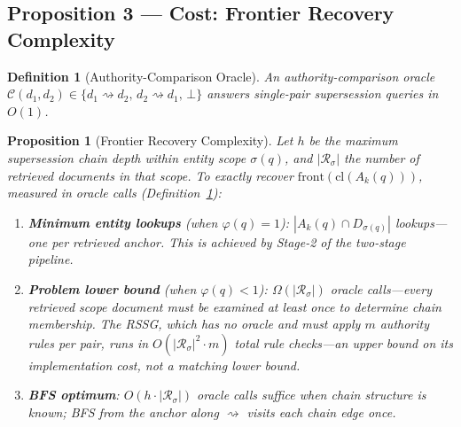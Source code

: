 \documentclass[11pt]{article}
\newtheorem{definition}{Definition}
\newtheorem{proposition}{Proposition}
\begin{document}
\subsection{Proposition 3 — Cost: Frontier Recovery Complexity}

\setcounter{proposition}{2}
\begin{definition}[Authority-Comparison Oracle]
\label{def:oracle}
An \emph{authority-comparison oracle} $\mathcal{C}(d_1,d_2) \in \{d_1 \rightsquigarrow d_2,\, d_2 \rightsquigarrow d_1,\, \bot\}$ answers single-pair supersession queries in $O(1)$.
\end{definition}

\begin{proposition}[Frontier Recovery Complexity]
\label{prop:complexity}
Let $h$ be the maximum supersession chain depth within entity scope $\sigma(q)$, and $|\mathcal{R}_{\sigma}|$ the number of retrieved documents in that scope. To exactly recover $\mathrm{front}(\mathrm{cl}(A_k(q)))$, measured in oracle calls (Definition~\ref{def:oracle}):
\begin{enumerate}[noitemsep,label=(\roman*)]
  \item \textbf{Minimum entity lookups} (when $\varphi(q) = 1$): $|A_k(q) \cap D_{\sigma(q)}|$ lookups---one per retrieved anchor. This is achieved by Stage-2 of the two-stage pipeline.
  \item \textbf{Problem lower bound} (when $\varphi(q) < 1$): $\Omega(|\mathcal{R}_{\sigma}|)$ oracle calls---every retrieved scope document must be examined at least once to determine chain membership. The RSSG, which has no oracle and must apply $m$ authority rules per pair, runs in $O(|\mathcal{R}_{\sigma}|^2 \cdot m)$ total rule checks---an upper bound on its implementation cost, not a matching lower bound.
  \item \textbf{BFS optimum}: $O(h \cdot |\mathcal{R}_{\sigma}|)$ oracle calls suffice when chain structure is known; BFS from the anchor along $\rightsquigarrow$ visits each chain edge once.
\end{enumerate}
\end{proposition}
\end{document}
